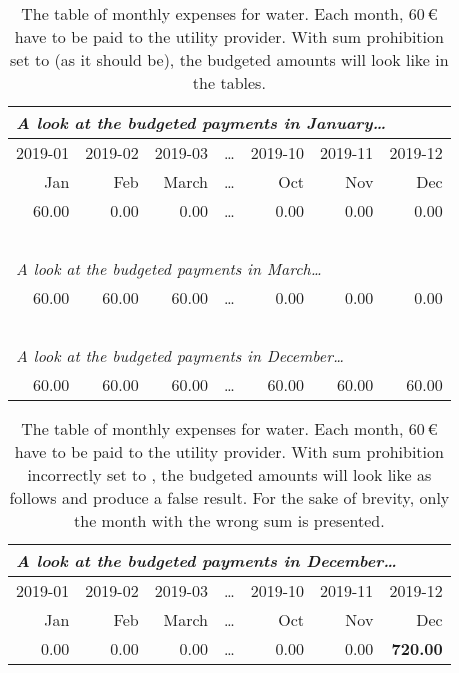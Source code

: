 \begin{table}[hbtp]
	\centering
	\sffamily
	\caption[The Tables of Monthly Expenses for Water]{The table of monthly expenses for water.
	Each month, 60\,€ have to be paid to the utility provider.
	With sum prohibition set to  (as it should be), the budgeted amounts will look like in the tables.}
	\label{tab:example-budgeting-utility-water-good}
	\begin{tabular}{|r|r|r|r|r|r|r|}
		\multicolumn{7}{l}{\footnotesize \emph{A look at the budgeted payments in January\ldots}}\\
		\hline
		\small 2019-01 & \small 2019-02 & \small 2019-03 & \ldots & \small 2019-10 & \small 2019-11 & \small 2019-12\\
		\hline
		Jan & Feb & March & \ldots & Oct & Nov & Dec\\
		\hline
		\hline
		60.00 & 0.00 & 0.00 & \ldots & 0.00 & 0.00 & 0.00\\
		\hline
		\multicolumn{7}{l}{~}\\
		\multicolumn{7}{l}{\footnotesize \emph{A look at the budgeted payments in March\ldots}}\\
		\hline
		60.00 & 60.00 & 60.00 & \ldots & 0.00 & 0.00 & 0.00\\
		\hline
		\multicolumn{7}{l}{~}\\
		\multicolumn{7}{l}{\footnotesize \emph{A look at the budgeted payments in December\ldots}}\\
		\hline
		60.00 & 60.00 & 60.00 & \ldots & 60.00 & 60.00 & 60.00\\
		\hline
	\end{tabular}
\end{table}

\begin{table}[hbtp]
	\centering
	\sffamily
	\caption[Budgeting Example: The Tables of Incorrectly Set Up Budgeted Monthly Expenses for the Item Utility: Water]{The table of monthly expenses for water.
	Each month, 60\,€ have to be paid to the utility provider.
	With sum prohibition incorrectly set to , the budgeted amounts will look like as follows and produce a false result.
	For the sake of brevity, only the month with the wrong sum is presented.}
	\label{tab:example-budgeting-utility-water-bad}
	\begin{tabular}{|r|r|r|r|r|r|r|}
		\multicolumn{7}{l}{\footnotesize \emph{A look at the budgeted payments in December\ldots}}\\
		\hline
		\small 2019-01 & \small 2019-02 & \small 2019-03 & \ldots & \small 2019-10 & \small 2019-11 & \small 2019-12\\
		\hline
		Jan & Feb & March & \ldots & Oct & Nov & Dec\\
		\hline
		\hline
		0.00 & 0.00 & 0.00 & \ldots & 0.00 & 0.00 & \textbf{720.00}\color{black!60!red}\ding{53}\\
		\hline
	\end{tabular}
\end{table}